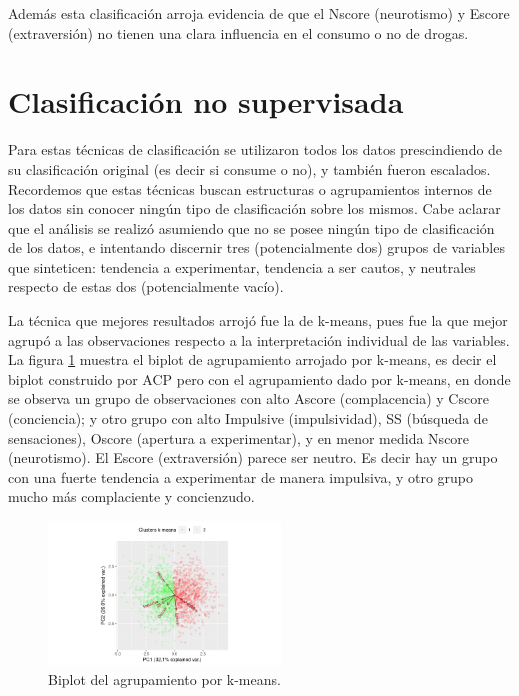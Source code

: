 \documentclass[a4paper,twocolumn]{article}
\begin{document}
Además esta clasificación arroja evidencia de que el Nscore (neurotismo) y Escore (extraversión) no tienen una clara influencia en el consumo o no de drogas.





\section{Clasificación no supervisada}
Para estas técnicas de clasificación se utilizaron todos los datos prescindiendo de su clasificación original (es decir si consume o no), y también fueron escalados. Recordemos que estas técnicas buscan estructuras o agrupamientos internos de los datos sin conocer ningún tipo de clasificación sobre los mismos. Cabe aclarar que el análisis se realizó asumiendo que no se posee ningún tipo de clasificación de los datos, e intentando discernir tres (potencialmente dos) grupos de variables que sinteticen: tendencia a experimentar, tendencia a ser cautos, y neutrales respecto de estas dos (potencialmente vacío).

La técnica que mejores resultados arrojó fue la de \mbox{k-means}, pues fue la que mejor agrupó a las observaciones respecto a la interpretación individual de las variables. La figura \ref{fig:kmeans} muestra el biplot de agrupamiento arrojado por k-means, es decir el biplot construido por ACP pero con el agrupamiento dado por k-means, en donde se observa un grupo de observaciones con alto Ascore (complacencia) y Cscore (conciencia); y otro grupo con alto Impulsive (impulsividad), SS (búsqueda de sensaciones), Oscore (apertura a experimentar), y en menor medida Nscore (neurotismo). El Escore (extraversión) parece ser neutro. Es decir hay un grupo con una fuerte tendencia a experimentar de manera impulsiva, y otro grupo mucho más complaciente y concienzudo.


\begin{figure}[h]
	\centering
	\includegraphics[trim={4cm 0.2cm 2cm 0.5cm}, clip=true, width=0.55\textwidth]{kmeans.png}
	\caption{Biplot del agrupamiento por k-means.}
	\label{fig:kmeans}
\end{figure}
\end{document}
